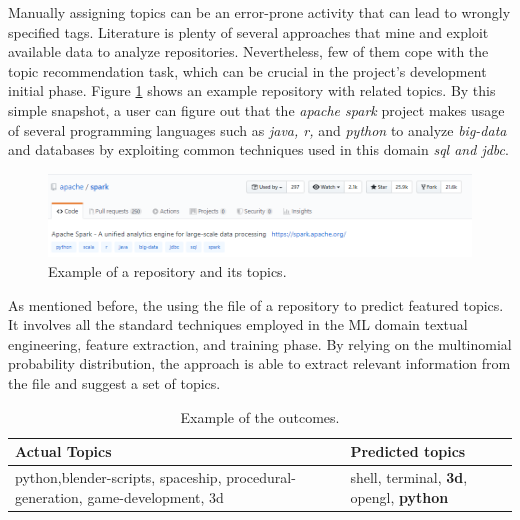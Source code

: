 
Manually assigning topics can be an error-prone activity that can lead to
wrongly specified tags. Literature is plenty of several approaches that mine and exploit available data to analyze repositories. Nevertheless, few of them cope with the topic recommendation task, which can be crucial in the project's development initial phase. Figure \ref{fig:spark} shows an example repository with related topics. By this simple snapshot, a \GH user can figure out that the \emph{apache spark} project makes usage of several programming languages such as \emph{java, r,} and \emph{python} to analyze \emph{big-data} and databases by exploiting common techniques used in this domain \ie \emph{sql and jdbc}. 

\begin{figure}[h!]
	\centering
	\includegraphics[width=0.8\linewidth]{figs/spark_topics.png}
	\caption{Example of a \GH repository and its topics.}%
	\label{fig:spark}
\end{figure}

As mentioned before, the \MNB using the \RM file of a repository to predict featured topics. It involves all the standard techniques employed in the ML domain \ie textual engineering, feature extraction, and training phase. By relying on the multinomial probability distribution, the approach is able to extract relevant information from the \RM file and suggest a set of topics. 

\begin{table}[h]
\centering

\resizebox{8.5cm}{!} {

\begin{tabular}{| p{3.2cm} | p{3.2cm} | }
\hline
 \textbf{Actual Topics} &\textbf{ Predicted topics} \\ \hline
     python,blender-scripts, spaceship, procedural-generation, game-development, 3d        &  
  shell, terminal, \textbf{3d},	opengl,	\textbf{python}        \\ \hline

\end{tabular}
}
\caption{Example of the \MNB outcomes.}
\label{tab:example}
\end{table} 